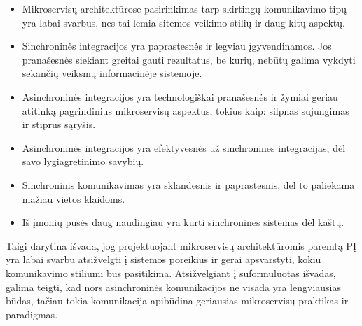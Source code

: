 \begin{itemize}
  \item Mikroservisų architektūrose pasirinkimas tarp skirtingų komunikavimo tipų yra labai svarbus, nes tai lemia sitemos veikimo stilių ir daug kitų aspektų.
	\item Sinchroninės integracijos yra paprastesnės ir legviau įgyvendinamos. Jos pranašesnės siekiant greitai gauti rezultatus, be kurių, nebūtų galima vykdyti
	sekančių veiksmų informacinėje sistemoje.
	\item Asinchroninės integracijos yra technologiškai pranašesnės ir žymiai geriau atitinką pagrindinius mikroservisų aspektus, tokius kaip: silpnas sujungimas ir stiprus sąryšis.
	\item Asinchroninės integracijos yra efektyvesnės už sinchronines integracijas, dėl savo lygiagretinimo savybių.
	\item Sinchroninis komunikavimas yra sklandesnis ir paprastesnis, dėl to paliekama mažiau vietos klaidoms.
	\item Iš įmonių pusės daug naudingiau yra kurti sinchronines sistemas dėl kaštų.
\end{itemize}

Taigi darytina išvada, jog projektuojant mikroservisų architektūromis paremtą PĮ yra labai svarbu atsižvelgti į sistemos poreikius ir gerai apsvarstyti, kokiu komunikavimo
stiliumi bus pasitikima. Atsižvelgiant į suformuluotas išvadas, galima teigti, kad nors asinchroninės komunikacijos ne visada yra lengviausias būdas, tačiau 
tokia komunikacija apibūdina geriausias mikroservisų praktikas ir paradigmas.

